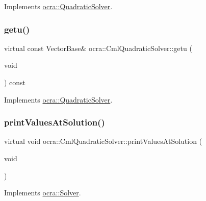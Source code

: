 Implements \hyperlink{classocra_1_1QuadraticSolver_a2a907a3fc7c60a7bf9e6a3403c544dcc}{ocra\+::\+Quadratic\+Solver}.

\hypertarget{classocra_1_1CmlQuadraticSolver_af674cde45f84730e2447d0e34a6e6918}{}\label{classocra_1_1CmlQuadraticSolver_af674cde45f84730e2447d0e34a6e6918} 
\subsubsection{\texorpdfstring{getu()}{getu()}}
{\footnotesize\ttfamily virtual const Vector\+Base\& ocra\+::\+Cml\+Quadratic\+Solver\+::getu (\begin{DoxyParamCaption}\item[{void}]{ }\end{DoxyParamCaption}) const\hspace{0.3cm}{\ttfamily [virtual]}}



Implements \hyperlink{classocra_1_1QuadraticSolver_a6d5040842f155042064a33939aa60385}{ocra\+::\+Quadratic\+Solver}.

\hypertarget{classocra_1_1CmlQuadraticSolver_aed7554d599282ef5e8a7567b73b822b8}{}\label{classocra_1_1CmlQuadraticSolver_aed7554d599282ef5e8a7567b73b822b8} 
\subsubsection{\texorpdfstring{print\+Values\+At\+Solution()}{printValuesAtSolution()}}
{\footnotesize\ttfamily virtual void ocra\+::\+Cml\+Quadratic\+Solver\+::print\+Values\+At\+Solution (\begin{DoxyParamCaption}\item[{void}]{ }\end{DoxyParamCaption})\hspace{0.3cm}{\ttfamily [virtual]}}



Implements \hyperlink{classocra_1_1Solver_ab1903098e25c16a9f92c36d37967e8fa}{ocra\+::\+Solver}.

\hypertarget{classocra_1_1CmlQuadraticSolver_a2c2240bd0bcee4f0cd57030ed08baabd}{}\label{classocra_1_1CmlQuadraticSolver_a2c2240bd0bcee4f0cd57030ed08baabd} 
